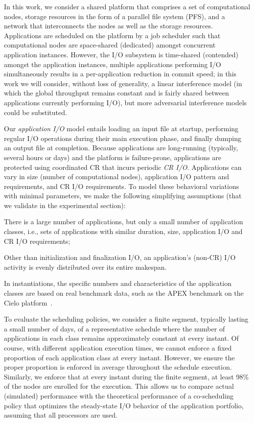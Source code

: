 In this work, we consider a shared platform that comprises a set of computational
nodes, storage resources in the form of a parallel file system (PFS), and a network that
interconnects the nodes as well as the storage resources. Applications are scheduled
on the platform by a job scheduler such that computational nodes are space-shared
(dedicated) amongst concurrent application instances. However, the I/O subsystem is
time-shared (contended) amongst the application instances, \ie multiple applications
performing I/O simultaneously results in a per-application reduction in commit speed;
in this work we will consider, without loss of generality, a linear interference
model (in which the global throughput remains constant and is fairly shared
between applications currently performing I/O), but more adversarial interference
models could be substituted.

Our \emph{application I/O} model entails loading an input file at startup, performing
regular I/O operations during their main execution phase, and finally dumping an
output file at completion. Because applications are long-running (typically, several
hours or days) and the platform is failure-prone, applications are protected using
coordinated CR that incurs periodic \emph{CR I/O}.
Applications can vary in size (number of computational nodes), application I/O
pattern and requirements, and CR I/O requirements. To model these behavioral
variations with minimal parameters, we make the following simplifying assumptions
(that we validate in the experimental section):
\begin{compactitem}
  \item There is a large number of applications, but only a small number of
    application classes, i.e., sets of applications with similar duration, size,
    application I/O and CR I/O requirements;
  \item Other than initialization and finalization I/O, an application's (non-CR) I/O
    activity is evenly distributed over its entire makespan.
\end{compactitem}
In instantiations, the specific numbers and characteristics of the application classes
are based on real benchmark data, such as the APEX benchmark on the Cielo platform~\cite{apex2016}.

To evaluate the scheduling policies, we consider a finite segment, typically lasting
a small number of days, of a representative schedule where the number of applications
in each class remains approximately constant at every instant. Of course, with
different application execution times, we cannot enforce a fixed proportion of each
application class at every instant. However, we ensure the proper proportion is
enforced in average throughout the schedule execution. Similarly, we enforce
that at every instant during the finite segment, at least 98\% of the nodes
are enrolled for the execution. This allows us to compare actual
(simulated) performance with the theoretical performance of a co-scheduling policy
that optimizes the steady-state I/O behavior of the application portfolio, assuming
that all processors are used.

